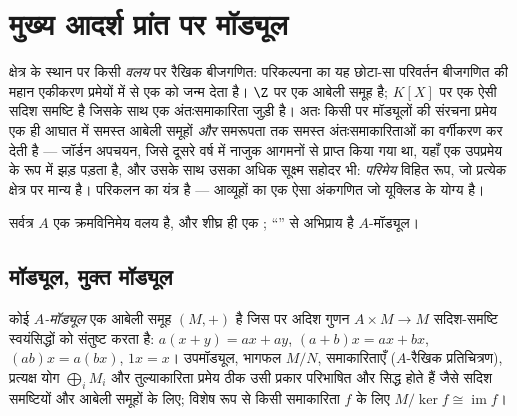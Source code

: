 \chapter{मुख्य आदर्श प्रांत पर मॉड्यूल}\label{ch:b3:modules}

क्षेत्र के स्थान पर किसी \emph{वलय} पर रैखिक बीजगणित: परिकल्पना
का यह छोटा-सा परिवर्तन बीजगणित की महान एकीकरण प्रमेयों में से एक
को जन्म देता है। $\Z$ पर  एक आबेली समूह है; $K[X]$ पर 
एक ऐसी सदिश समष्टि है जिसके साथ एक अंतःसमाकारिता जुड़ी है। अतः
किसी  पर  मॉड्यूलों की संरचना प्रमेय एक ही आघात
में समस्त  आबेली समूहों \emph{और} समरूपता तक समस्त
अंतःसमाकारिताओं का वर्गीकरण कर देती है --- जॉर्डन अपचयन, जिसे
दूसरे वर्ष में नाजुक आगमनों से प्राप्त किया गया था, यहाँ एक
उपप्रमेय के रूप में झड़ पड़ता है, और उसके साथ उसका अधिक सूक्ष्म
सहोदर भी: \emph{परिमेय} विहित रूप, जो प्रत्येक क्षेत्र पर मान्य
है। परिकलन का यंत्र है  --- आव्यूहों का एक
ऐसा अंकगणित जो यूक्लिड के योग्य है।

सर्वत्र $A$ एक क्रमविनिमेय वलय है, और शीघ्र ही एक ;
``'' से अभिप्राय है $A$-मॉड्यूल।

\section{मॉड्यूल, मुक्त मॉड्यूल}

\begin{definition}\label{def:b3:modules:module}
कोई \emph{$A$-मॉड्यूल} एक आबेली समूह $(M, +)$ है जिस
पर अदिश गुणन $A \times M \to M$ सदिश-समष्टि स्वयंसिद्धों को संतुष्ट करता है:
$a(x + y) = ax + ay$, $(a + b)x = ax + bx$, $(ab)x = a(bx)$, $1x = x$। उपमॉड्यूल, भागफल $M/N$, समाकारिताएँ
($A$-रैखिक प्रतिचित्रण), प्रत्यक्ष योग $\bigoplus_i M_i$ और तुल्याकारिता
प्रमेय ठीक उसी प्रकार परिभाषित और सिद्ध होते हैं जैसे सदिश
समष्टियों और आबेली समूहों के लिए; विशेष रूप से किसी समाकारिता
$f$ के लिए $M/\ker f \cong
\operatorname{im} f$।
\end{definition}

